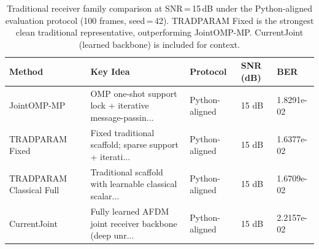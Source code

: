 \begin{table}[t]
\centering
\caption{Traditional receiver family comparison at SNR\,=\,15\,dB under the Python-aligned evaluation protocol (100 frames, seed\,=\,42). TRADPARAM Fixed is the strongest clean traditional representative, outperforming JointOMP-MP. CurrentJoint (learned backbone) is included for context.}
\label{tab:traditional_receivers}
\setlength{\tabcolsep}{5pt}
\begin{tabular}{lllll}
\toprule
\textbf{Method} & \textbf{Key Idea} & \textbf{Protocol} & \textbf{SNR (dB)} & \textbf{BER} \\
\midrule
JointOMP-MP & OMP one-shot support lock + iterative message-passin... & Python-aligned & 15 dB & 1.8291e-02 \\
TRADPARAM Fixed & Fixed traditional scaffold; sparse support + iterati... & Python-aligned & 15 dB & 1.6377e-02 \\
TRADPARAM Classical Full & Traditional scaffold with learnable classical scalar... & Python-aligned & 15 dB & 1.6709e-02 \\
CurrentJoint & Fully learned AFDM joint receiver backbone (deep unr... & Python-aligned & 15 dB & 2.2157e-02 \\
\bottomrule
\end{tabular}
\end{table}
